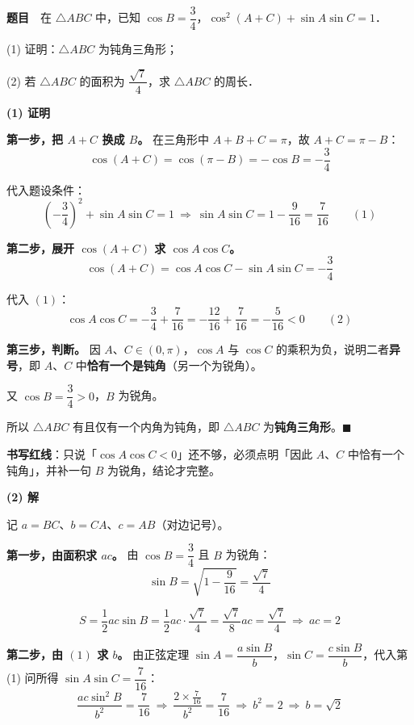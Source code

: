 \par\medskip


\textbf{题目}　在 $\triangle ABC$ 中，已知 $\cos B=\dfrac{3}{4}$，$\cos^2(A+C)+\sin A\sin C=1$．

  (1) 证明：$\triangle ABC$ 为钝角三角形；

  (2) 若 $\triangle ABC$ 的面积为 $\dfrac{\sqrt{7}}{4}$，求 $\triangle ABC$ 的周长．

\par\medskip

\textbf{(1) 证明}

\textbf{第一步，把 $A+C$ 换成 $B$。} 在三角形中 $A+B+C=\pi$，故 $A+C=\pi-B$：
\[\cos(A+C)=\cos(\pi-B)=-\cos B=-\frac34\]

代入题设条件：
\[\left(-\frac34\right)^2+\sin A\sin C=1\ \Longrightarrow\ \sin A\sin C=1-\frac{9}{16}=\frac{7}{16}\qquad(1)\]

\textbf{第二步，展开 $\cos(A+C)$ 求 $\cos A\cos C$。}
\[\cos(A+C)=\cos A\cos C-\sin A\sin C=-\frac34\]

代入 $(1)$：
\[\cos A\cos C=-\frac34+\frac{7}{16}=-\frac{12}{16}+\frac{7}{16}=-\frac{5}{16}<0\qquad(2)\]

\textbf{第三步，判断。} 因 $A$、$C\in(0,\pi)$，$\cos A$ 与 $\cos C$ 的乘积为负，说明二者\textbf{异号}，即 $A$、$C$ 中\textbf{恰有一个是钝角}（另一个为锐角）。

又 $\cos B=\dfrac34>0$，$B$ 为锐角。

所以 $\triangle ABC$ 有且仅有一个内角为钝角，即 $\triangle ABC$ 为\textbf{钝角三角形}。$\blacksquare$

\begin{gktip}
\textbf{书写红线}：只说「$\cos A\cos C<0$」还不够，必须点明「因此 $A$、$C$ 中恰有一个钝角」，并补一句 $B$ 为锐角，结论才完整。
\end{gktip}

\par\medskip

\textbf{(2) 解}

记 $a=BC$、$b=CA$、$c=AB$（对边记号）。

\textbf{第一步，由面积求 $ac$。} 由 $\cos B=\dfrac34$ 且 $B$ 为锐角：
\[\sin B=\sqrt{1-\frac{9}{16}}=\frac{\sqrt7}{4}\]

\[S=\frac12ac\sin B=\frac12ac\cdot\frac{\sqrt7}{4}=\frac{\sqrt7}{8}ac=\frac{\sqrt7}{4}\ \Longrightarrow\ ac=2\]

\textbf{第二步，由 $(1)$ 求 $b$。} 由正弦定理 $\sin A=\dfrac{a\sin B}{b}$，$\sin C=\dfrac{c\sin B}{b}$，代入第 (1) 问所得 $\sin A\sin C=\dfrac{7}{16}$：
\[\frac{ac\sin^2B}{b^2}=\frac{7}{16}\ \Longrightarrow\ \frac{2\times\frac{7}{16}}{b^2}=\frac{7}{16}\ \Longrightarrow\ b^2=2\ \Longrightarrow\ b=\sqrt2\]

